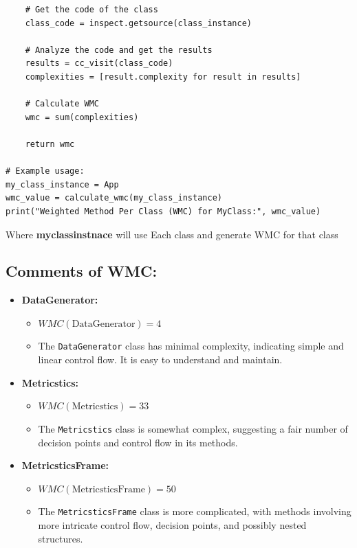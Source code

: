 {{{{\begin{verbatim}
    # Get the code of the class
    class_code = inspect.getsource(class_instance)

    # Analyze the code and get the results
    results = cc_visit(class_code)
    complexities = [result.complexity for result in results]

    # Calculate WMC
    wmc = sum(complexities)

    return wmc

# Example usage:
my_class_instance = App
wmc_value = calculate_wmc(my_class_instance)
print("Weighted Method Per Class (WMC) for MyClass:", wmc_value)
\end{verbatim}

\normalsize{Where \textbf{myclassinstnace} will use Each class and generate WMC for that class}

\subsection{Comments of WMC: }
\begin{itemize}
    \item \textbf{DataGenerator:}
    \begin{itemize}
        \item $WMC(\text{DataGenerator}) = 4$
        \item The \texttt{DataGenerator} class has minimal complexity, indicating simple and linear control flow. It is easy to understand and maintain.
    \end{itemize}
    
    \item \textbf{Metricstics:}
    \begin{itemize}
        \item $WMC(\text{Metricstics}) = 33$
        \item The \texttt{Metricstics} class is somewhat complex, suggesting a fair number of decision points and control flow in its methods.
    \end{itemize}
    
    \item \textbf{MetricsticsFrame:}
    \begin{itemize}
        \item $WMC(\text{MetricsticsFrame}) = 50$
        \item The \texttt{MetricsticsFrame} class is more complicated, with methods involving more intricate control flow, decision points, and possibly nested structures.
    \end{itemize}
    

\end{itemize}}}}}
